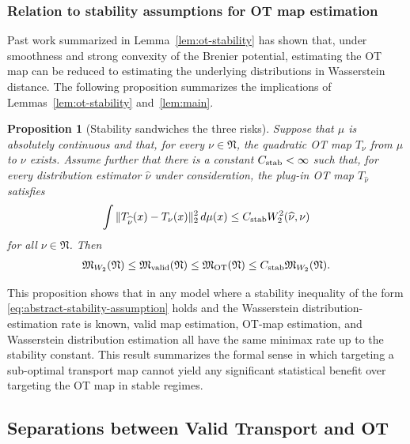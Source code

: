 \documentclass[11pt,twoside]{article}
\newtheorem{proposition}{Proposition}
\newcommand{\targetclass}{\mathfrak{N}}
\newcommand{\validminimaxrisk}{\mathfrak{M}_{\text{valid}}}
\newcommand{\otminimaxrisk}{\mathfrak{M}_{\text{OT}}}
\newcommand{\wtwominimaxrisk}{\mathfrak M_{W_2}}
\begin{document}
\subsubsection*{Relation to stability assumptions for OT map estimation}

Past work summarized in Lemma~\ref{lem:ot-stability} has shown that, under smoothness and strong convexity of the Brenier potential, estimating the OT map can be reduced to estimating the underlying distributions in Wasserstein distance. The following proposition summarizes the implications of Lemmas~\ref{lem:ot-stability} and~\ref{lem:main}.

\begin{proposition}[Stability sandwiches the three risks]
\label{prop:stability-sandwich}
Suppose that $\mu$ is absolutely continuous and that, for every $\nu\in\targetclass$, the quadratic OT map $T_\nu$ from $\mu$ to $\nu$ exists. Assume further that there is a constant $C_{\rm stab}<\infty$ such that, for every distribution estimator $\widehat\nu$ under consideration, the plug-in OT map $T_{\widehat\nu}$ satisfies
\begin{align}
\label{eq:abstract-stability-assumption}
\int \|T_{\widehat\nu}(x)-T_\nu(x)\|_2^2\,d\mu(x)
\leq
C_{\rm stab} W_2^2(\widehat\nu,\nu)
\end{align}
for all $\nu\in\targetclass$. Then
\begin{align}
\label{eq:stability-sandwich}
\wtwominimaxrisk(\targetclass)
\leq
\validminimaxrisk(\targetclass)
\leq
\otminimaxrisk(\targetclass)
\leq
C_{\rm stab}\wtwominimaxrisk(\targetclass).
\end{align}
\end{proposition}

\noindent This proposition shows that in any model where a stability inequality of the form \eqref{eq:abstract-stability-assumption} holds and the Wasserstein distribution-estimation rate is known, valid map estimation, OT-map estimation, and Wasserstein distribution estimation all have the same minimax rate up to the stability constant. This result summarizes the formal sense in which targeting a sub-optimal transport map cannot yield any significant statistical benefit over targeting the OT map in stable regimes. 

\subsection{Separations between Valid Transport and OT}
\label{sec:separation}
\end{document}
